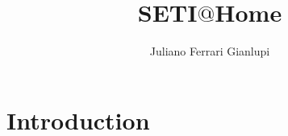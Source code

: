 
\title{SETI$@$Home}

\author{Juliano Ferrari Gianlupi}


\renewcommand{\shortauthors}{J. F. Gianlupi}


\begin{abstract}


 
\end{abstract}



\maketitle

\section{Introduction}\label{hid-sp18-601-project-section-introduction}
 
\section{}\label{}

\subsection{}\label{}




 

